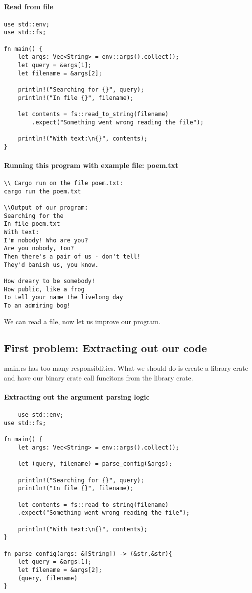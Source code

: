 \paragraph*{Read from file}\begin{lstlisting}
use std::env;
use std::fs;

fn main() {
    let args: Vec<String> = env::args().collect(); 
    let query = &args[1];
    let filename = &args[2];
    
    println!("Searching for {}", query);
    println!("In file {}", filename);

    let contents = fs::read_to_string(filename)
        .expect("Something went wrong reading the file");

    println!("With text:\n{}", contents);
}
\end{lstlisting}

\paragraph*{Running this program with example file: poem.txt}\begin{lstlisting}
\\ Cargo run on the file poem.txt:
cargo run the poem.txt

\\Output of our program:
Searching for the
In file poem.txt
With text:
I'm nobody! Who are you?
Are you nobody, too?
Then there's a pair of us - don't tell!
They'd banish us, you know.

How dreary to be somebody!
How public, like a frog
To tell your name the livelong day
To an admiring bog!
\end{lstlisting}


We can read a file, now let us improve our program.
\subsection{First problem: Extracting out our code}

main.rs has too many responsiblities. What we should do is create a library crate and have our binary crate call funcitons from the library crate.

\paragraph*{Extracting out the argument parsing logic}\begin{lstlisting}
    use std::env;
use std::fs;

fn main() {
    let args: Vec<String> = env::args().collect(); 
    
    let (query, filename) = parse_config(&args);

    println!("Searching for {}", query);
    println!("In file {}", filename);

    let contents = fs::read_to_string(filename)
    .expect("Something went wrong reading the file");

    println!("With text:\n{}", contents);
}

fn parse_config(args: &[String]) -> (&str,&str){
    let query = &args[1];
    let filename = &args[2];
    (query, filename)
}
\end{lstlisting}

